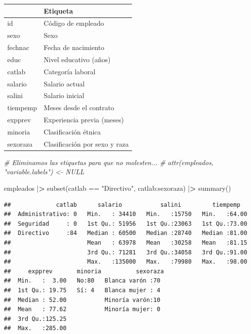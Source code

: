 \documentclass[
]{book}
\newenvironment{Shaded}{\begin{snugshade}}{\end{snugshade}}
\newcommand{\CommentTok}[1]{\textcolor[rgb]{0.56,0.35,0.01}{\textit{#1}}}
\newcommand{\ErrorTok}[1]{\textcolor[rgb]{0.64,0.00,0.00}{\textbf{#1}}}
\newcommand{\FunctionTok}[1]{\textcolor[rgb]{0.00,0.00,0.00}{#1}}
\newcommand{\NormalTok}[1]{#1}
\newcommand{\SpecialCharTok}[1]{\textcolor[rgb]{0.00,0.00,0.00}{#1}}
\newcommand{\StringTok}[1]{\textcolor[rgb]{0.31,0.60,0.02}{#1}}
\theoremstyle{break}
\theoremstyle{nonumberplain}
\begin{document}
\begin{tabular}{l|l}
\hline
  & Etiqueta\\
\hline
id & Código de empleado\\
\hline
sexo & Sexo\\
\hline
fechnac & Fecha de nacimiento\\
\hline
educ & Nivel educativo  (años)\\
\hline
catlab & Categoría laboral\\
\hline
salario & Salario actual\\
\hline
salini & Salario inicial\\
\hline
tiempemp & Meses desde el contrato\\
\hline
expprev & Experiencia previa (meses)\\
\hline
minoria & Clasificación étnica\\
\hline
sexoraza & Clasificación por sexo y raza\\
\hline
\end{tabular}

\begin{Shaded}
\begin{Highlighting}[]
\CommentTok{\# Eliminamos las etiquetas para que no molesten...}
\CommentTok{\# attr(empleados, "variable.labels") \textless{}{-} NULL  }

\NormalTok{empleados }\SpecialCharTok{|}\ErrorTok{\textgreater{}}  \FunctionTok{subset}\NormalTok{(catlab }\SpecialCharTok{==} \StringTok{"Directivo"}\NormalTok{, catlab}\SpecialCharTok{:}\NormalTok{sexoraza) }\SpecialCharTok{|}\ErrorTok{\textgreater{}}  \FunctionTok{summary}\NormalTok{()}
\end{Highlighting}
\end{Shaded}

\begin{verbatim}
##             catlab      salario           salini         tiempemp    
##  Administrativo: 0   Min.   : 34410   Min.   :15750   Min.   :64.00  
##  Seguridad     : 0   1st Qu.: 51956   1st Qu.:23063   1st Qu.:73.00  
##  Directivo     :84   Median : 60500   Median :28740   Median :81.00  
##                      Mean   : 63978   Mean   :30258   Mean   :81.15  
##                      3rd Qu.: 71281   3rd Qu.:34058   3rd Qu.:91.00  
##                      Max.   :135000   Max.   :79980   Max.   :98.00  
##     expprev       minoria          sexoraza 
##  Min.   :  3.00   No:80   Blanca varón :70  
##  1st Qu.: 19.75   Sí: 4   Blanca mujer : 4  
##  Median : 52.00           Minoría varón:10  
##  Mean   : 77.62           Minoría mujer: 0  
##  3rd Qu.:125.25                             
##  Max.   :285.00
\end{verbatim}
\end{document}
